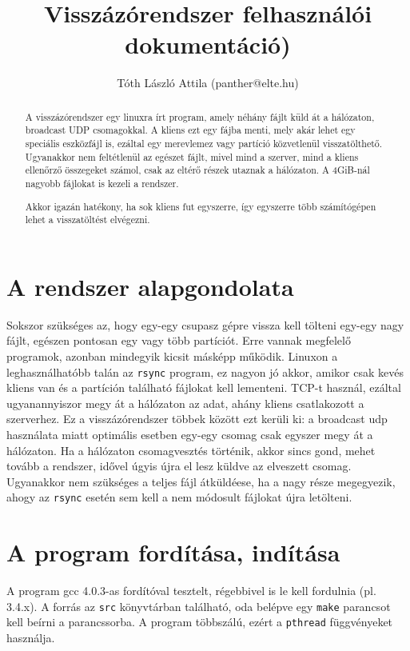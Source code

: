 \documentclass[fleqn,10pt,a4paper,titlepage]{article}
\title{Visszázórendszer felhasználói dokumentáció)}
\author{Tóth László Attila (panther@elte.hu)}
\date{}
\begin{document}
  \maketitle
  \mktoc

  \begin{abstract}
    A visszázórendszer egy linuxra írt program, amely néhány fájlt küld át a hálózaton, broadcast UDP csomagokkal. A
    kliens ezt egy fájba menti, mely akár lehet egy speciális eszközfájl is, ezáltal egy merevlemez vagy partíció
    közvetlenül visszatölthető. Ugyanakkor nem feltétlenül az egészet fájlt, mivel mind a szerver, mind a kliens
    ellenőrző összegeket számol, csak az eltérő részek utaznak a hálózaton. A 4GiB-nál nagyobb fájlokat is kezeli a
    rendszer.
    
    Akkor igazán hatékony, ha sok kliens fut egyszerre, így egyszerre több számítógépen lehet a visszatöltést elvégezni.
  \end{abstract}

  \section{A rendszer alapgondolata}
  Sokszor szükséges az, hogy egy-egy csupasz gépre vissza kell tölteni egy-egy nagy fájlt, egészen pontosan egy vagy
  több partíciót. Erre vannak megfelelő programok, azonban mindegyik kicsit másképp működik. Linuxon a leghasználhatóbb
  talán az \texttt{rsync} program, ez nagyon jó akkor, amikor csak kevés kliens van és a partíción található fájlokat
  kell lementeni. TCP-t használ, ezáltal ugyanannyiszor megy át a hálózaton az adat, ahány kliens csatlakozott a
  szerverhez.
  Ez a visszázórendszer többek között ezt kerüli ki: a broadcast udp használata miatt optimális esetben egy-egy csomag
  csak egyszer megy át a hálózaton. Ha a hálózaton csomagvesztés történik, akkor sincs gond, mehet tovább a rendszer,
  idővel úgyis újra el lesz küldve az elveszett csomag. Ugyanakkor nem szükséges a teljes fájl átküldéese, ha a nagy
  része megegyezik, ahogy az \texttt{rsync} esetén sem kell a nem módosult fájlokat újra letölteni.
  
  \section{A program fordítása, indítása}
  A program gcc 4.0.3-as fordítóval tesztelt, régebbivel is le kell fordulnia (pl. 3.4.x). A forrás az \texttt{src}
  könyvtárban található, oda belépve egy \texttt{make} parancsot kell beírni a parancssorba. A program többszálú, ezért
  a \texttt{pthread} függvényeket használja.
\end{document}
